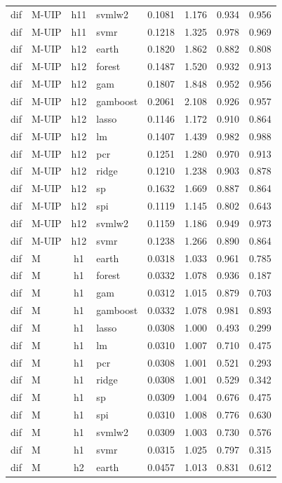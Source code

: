 \begin{ThreePartTable}
\begin{longtable}[t]{llclcccc}
dif & M-UIP & h11 & svmlw2 & 0.1081 & 1.176 & 0.934 & 0.956\\
dif & M-UIP & h11 & svmr & 0.1218 & 1.325 & 0.978 & 0.969\\
\addlinespace
dif & M-UIP & h12 & earth & 0.1820 & 1.862 & 0.882 & 0.808\\
dif & M-UIP & h12 & forest & 0.1487 & 1.520 & 0.932 & 0.913\\
dif & M-UIP & h12 & gam & 0.1807 & 1.848 & 0.952 & 0.956\\
dif & M-UIP & h12 & gamboost & 0.2061 & 2.108 & 0.926 & 0.957\\
dif & M-UIP & h12 & lasso & 0.1146 & 1.172 & 0.910 & 0.864\\
dif & M-UIP & h12 & lm & 0.1407 & 1.439 & 0.982 & 0.988\\
dif & M-UIP & h12 & pcr & 0.1251 & 1.280 & 0.970 & 0.913\\
dif & M-UIP & h12 & ridge & 0.1210 & 1.238 & 0.903 & 0.878\\
dif & M-UIP & h12 & sp & 0.1632 & 1.669 & 0.887 & 0.864\\
dif & M-UIP & h12 & spi & 0.1119 & 1.145 & 0.802 & 0.643\\
dif & M-UIP & h12 & svmlw2 & 0.1159 & 1.186 & 0.949 & 0.973\\
dif & M-UIP & h12 & svmr & 0.1238 & 1.266 & 0.890 & 0.864\\
\addlinespace
dif & M & h1 & earth & 0.0318 & 1.033 & 0.961 & 0.785\\
dif & M & h1 & forest & 0.0332 & 1.078 & 0.936 & 0.187\\
dif & M & h1 & gam & 0.0312 & 1.015 & 0.879 & 0.703\\
dif & M & h1 & gamboost & 0.0332 & 1.078 & 0.981 & 0.893\\
dif & M & h1 & lasso & 0.0308 & 1.000 & 0.493 & 0.299\\
dif & M & h1 & lm & 0.0310 & 1.007 & 0.710 & 0.475\\
dif & M & h1 & pcr & 0.0308 & 1.001 & 0.521 & 0.293\\
dif & M & h1 & ridge & 0.0308 & 1.001 & 0.529 & 0.342\\
dif & M & h1 & sp & 0.0309 & 1.004 & 0.676 & 0.475\\
dif & M & h1 & spi & 0.0310 & 1.008 & 0.776 & 0.630\\
dif & M & h1 & svmlw2 & 0.0309 & 1.003 & 0.730 & 0.576\\
dif & M & h1 & svmr & 0.0315 & 1.025 & 0.797 & 0.315\\
\addlinespace
dif & M & h2 & earth & 0.0457 & 1.013 & 0.831 & 0.612\\

\end{longtable}
\end{ThreePartTable}
